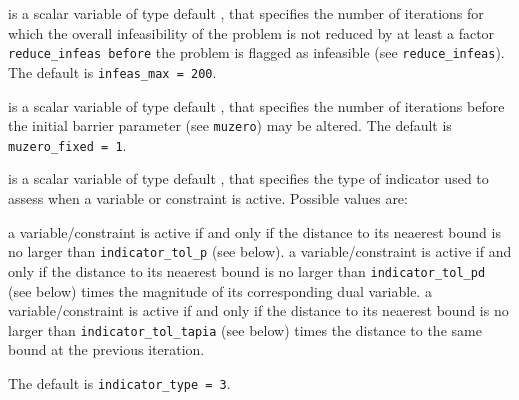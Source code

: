 \documentclass{galahad}
\begin{document}
\begin{description}




 is a scalar variable of type default \integer, that specifies
the number of iterations for which the overall infeasibility
of the problem is not reduced by at least a factor {\tt reduce\_infeas
before} the problem is flagged as infeasible (see {\tt reduce\_infeas}).
The default is {\tt infeas\_max = 200}.

 is a scalar variable of type default \integer, 
that specifies
the number of iterations before the initial barrier parameter 
(see {\tt muzero}) may be altered.
The default is {\tt muzero\_fixed = 1}.

 is a scalar variable of type default \integer, 
that specifies the type of indicator used to assess when a variable or
constraint is active.
Possible values are:

\begin{description}
 a variable/constraint is active if and only if the distance 
to its neaerest bound is no larger than {\tt indicator\-\_tol\_p} (see below).
 a variable/constraint is active if and only if the distance 
to its neaerest bound is no larger than {\tt indicator\-\_tol\_pd} 
(see below) times the magnitude of its corresponding dual variable.
 a variable/constraint is active if and only if the distance 
to its neaerest bound is no larger than {\tt indicator\-\_tol\_tapia} 
(see below) times the distance to the same bound at the previous iteration.
\end{description}
The default is {\tt indicator\_type = 3}.


\end{description}
\end{document}
